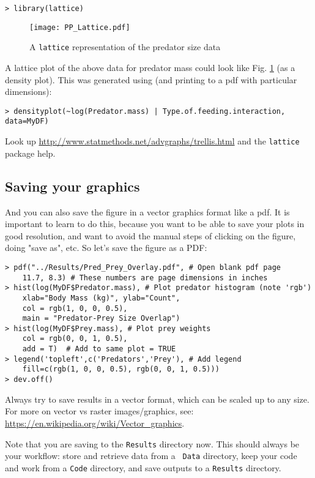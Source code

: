\begin{lstlisting}
> library(lattice)
\end{lstlisting}

\begin{figure}
\centering
	\label{Fig-Lattice-1}
	\texttt{[image: PP\_Lattice.pdf]}
	\caption{A {\tt lattice} representation of the predator size data}
\end{figure}

A lattice plot of the above data for predator mass could look like Fig. 
\ref{Fig-Lattice-1} (as a density plot). This was generated using (and 
printing to a pdf with particular dimensions):

\begin{lstlisting}
> densityplot(~log(Predator.mass) | Type.of.feeding.interaction, 
data=MyDF)
\end{lstlisting}

Look up \url{http://www.statmethods.net/advgraphs/trellis.html} and the 
{\tt lattice} package help.

\subsection{Saving your graphics}

And you can also save the figure in a vector graphics format like a 
pdf. It is important to learn to do this, because you want to be able 
to save your plots in good resolution, and want to avoid the manual 
steps of clicking on the figure, doing "save as", etc. So let's 
save the figure as a PDF:  
\begin{lstlisting}
> pdf("../Results/Pred_Prey_Overlay.pdf", # Open blank pdf page 
    11.7, 8.3) # These numbers are page dimensions in inches
> hist(log(MyDF$Predator.mass), # Plot predator histogram (note 'rgb')
    xlab="Body Mass (kg)", ylab="Count", 
    col = rgb(1, 0, 0, 0.5), 
    main = "Predator-Prey Size Overlap") 
> hist(log(MyDF$Prey.mass), # Plot prey weights
    col = rgb(0, 0, 1, 0.5), 
    add = T)  # Add to same plot = TRUE
> legend('topleft',c('Predators','Prey'), # Add legend
    fill=c(rgb(1, 0, 0, 0.5), rgb(0, 0, 1, 0.5))) 
> dev.off() 
\end{lstlisting}

\begin{tipbox}
	Always try to save results in a vector format, which can be scaled up 
	to any size. For more on vector vs raster images/graphics, see: 
	\url{https://en.wikipedia.org/wiki/Vector_graphics}.
\end{tipbox}
Note that you are saving to the {\tt Results} directory now. This 
should always be your workflow: store and retrieve data from a {\tt 
Data} directory, keep your code and work from a {\tt Code} directory, 
and save outputs to a {\tt Results} directory.

